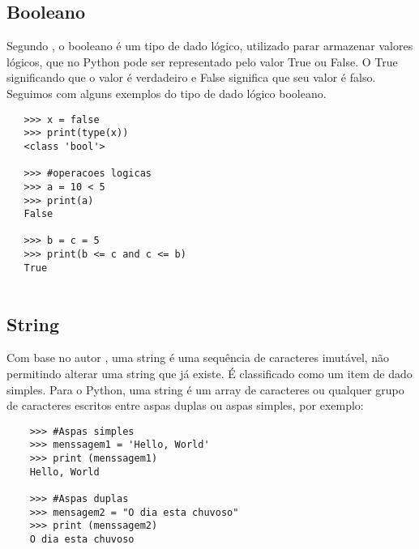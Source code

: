 			\subsection{Booleano}
			Segundo \cite{Perkovic2016}, o booleano é um tipo de dado lógico, utilizado parar armazenar valores lógicos, que no Python pode ser representado pelo valor True ou False. O True significando que o valor é verdadeiro e False significa que seu valor é falso. Seguimos com alguns exemplos do tipo de dado lógico booleano.
			\begin{lstlisting}
   >>> x = false
   >>> print(type(x))
   <class 'bool'>
   
   >>> #operacoes logicas
   >>> a = 10 < 5
   >>> print(a)
   False
   
   >>> b = c = 5
   >>> print(b <= c and c <= b)
   True
   
			\end{lstlisting}
            \subsection{String}
            Com base no autor \cite{Severance2016}, uma string é uma sequência de caracteres imutável, não permitindo alterar uma string que já existe. É classificado como um item de dado simples. Para o Python, uma string é um array de caracteres ou qualquer grupo de caracteres escritos entre aspas duplas ou aspas simples, por exemplo:
    \begin{lstlisting}
    >>> #Aspas simples
    >>> menssagem1 = 'Hello, World'
    >>> print (menssagem1)  
    Hello, World
    
    >>> #Aspas duplas
    >>> mensagem2 = "O dia esta chuvoso"
    >>> print (menssagem2)
    O dia esta chuvoso
    \end{lstlisting}
			
